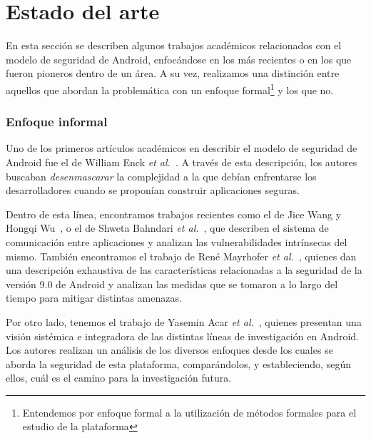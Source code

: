
\chapter*{Estado del arte}
\label{chapter:estado}

En esta sección se describen algunos trabajos académicos relacionados con el
modelo de seguridad de Android, enfocándose en los más recientes o en los que
fueron pioneros dentro de un área. A su vez, realizamos una distinción entre aquellos
que abordan la problemática con un enfoque formal\footnote{Entendemos por enfoque
formal a la utilización de métodos formales para el estudio de la plataforma} y
los que no.

\subsection*{Enfoque informal}
Uno de los primeros artículos académicos en describir el modelo de seguridad de
%
%
Android fue el de William Enck \textit{et al.}~\cite{enck}. A través de esta
descripción, los autores buscaban \textit{desenmascarar} la complejidad a la que
debían enfrentarse los desarrolladores cuando se proponían construir aplicaciones
seguras.

Dentro de esta línea, encontramos trabajos recientes como el de Jice Wang y
Hongqi Wu~\cite{wang}, o el de Shweta Bahndari \textit{et al.}~\cite{bhandari},
que describen el sistema de comunicación entre aplicaciones y analizan las
vulnerabilidades intrínsecas del mismo. También encontramos el trabajo de René
Mayrhofer \textit{et al.}~\cite{mayrhofer}, quienes dan una descripción
exhaustiva de las características relacionadas a la seguridad de la versión 9.0
de Android y analizan las medidas que se tomaron a lo largo del tiempo para
mitigar distintas amenazas.

Por otro lado, tenemos el trabajo de Yasemin Acar \textit{et al.}~\cite{sok},
quienes presentan una visión sistémica e integradora de las distintas líneas de
investigación en Android. Los autores realizan un análisis de los diversos
enfoques desde los cuales se aborda la seguridad de esta plataforma,
comparándolos, y estableciendo, según ellos, cuál es el camino para la
investigación futura.

